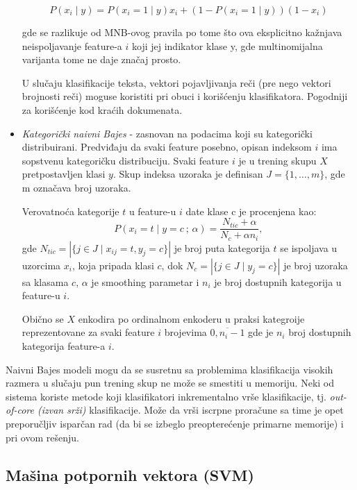 \documentclass[fontsize=12bp, paper=a4]{scrarticle}
\begin{document}
\begin{itemize}
    $$P(x_i \mid y) = P(x_i = 1 \mid y) x_i + (1 - P(x_i = 1 \mid y)) (1 - x_i)$$
    
    gde se razlikuje od MNB-ovog pravila po tome što ova eksplicitno kažnjava neispoljavanje feature-a $i$ koji jej indikator klase y, gde multinomijalna varijanta tome ne daje značaj prosto.

    U slučaju klasifikacije teksta, vektori pojavljivanja reči (pre nego vektori brojnosti reči) moguse koristiti pri obuci i korišćenju klasifikatora. Pogodniji za korišćenje kod kraćih dokumenata.

    \item \textit{Kategorički naivni Bajes} - zasnovan na podacima koji su kategorički distribuirani. Predviđaju da svaki feature posebno, opisan indeksom $i$ ima sopstvenu kategoričku distribuciju.
    Svaki feature $i$ je u trening skupu $X$ pretpostavljen klasi $y$. Skup indeksa uzoraka je definisan $J = \{1,\dots,m\}$, gde m označava broj uzoraka.

    Verovatnoća kategorije $t$ u feature-u $i$ date klase c je procenjena kao:
    $$P(x_i = t \mid y = c \: ;\, \alpha) = \frac{ N_{tic} + \alpha}{N_{c} +
                                       \alpha n_i},$$
    gde $N_{tic} = |\{j \in J \mid x_{ij} = t, y_j = c\}|$ je broj puta kategorija $t$ se ispoljava u uzorcima $x_i$, koja pripada klasi $c$, dok $N_{c} = |\{ j \in J\mid y_j = c\}|$ je broj uzoraka sa klasama $c$, $\alpha$ je smoothing parametar i $n_i$ je broj dostupnih kategorija u feature-u $i$.

    Obično se $X$ enkodira po ordinalnom enkoderu\cite{ordinal} u praksi kategroije reprezentovane za svaki feature $i$ brojevima $\overline{0,n_i-1}$ gde je $n_i$ broj dostupnih kategorija feature-a $i$.
\end{itemize}

Naivni Bajes modeli mogu da se susretnu sa problemima klasifikacija visokih razmera u slučaju pun trening skup ne može se smestiti u memoriju. Neki od sistema koriste metode koji klasifikatori inkrementalno vrše klasifikacije, tj. \textit{out-of-core (izvan srži)} klasifikacije. Može da vrši iscrpne proračune sa time je opet preporučljiv isparčan rad (da bi se izbeglo preopterećenje primarne memorije) i pri ovom rešenju.
\newpage

\subsection{Mašina potpornih vektora (SVM)}
\end{document}
